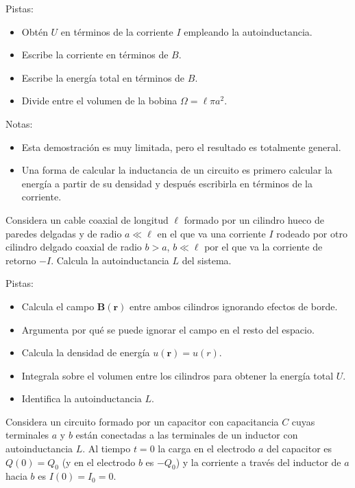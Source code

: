 \documentclass{exam}
\begin{document}
\begin{questions}
  Pistas:
  \begin{itemize}
  \item Obtén $U$ en términos de la corriente $I$ empleando la
    autoinductancia.
  \item Escribe la corriente en términos de $B$.
  \item Escribe la energía total en términos de $B$.
  \item Divide entre el volumen de la bobina $\Omega=\ell\pi a^2$.
  \end{itemize}
  Notas:
  \begin{itemize}
  \item Esta demostración es muy limitada, pero el resultado es
    totalmente general.
  \item Una forma de calcular la inductancia de un circuito es primero
    calcular la energía a partir de su densidad y después escribirla
    en términos de la corriente.
  \end{itemize}

  \question Considera un cable coaxial de longitud $\ell$ formado por un cilindro hueco
  de paredes delgadas y de radio $a\ll \ell$ en el que va una corriente
  $I$ rodeado por otro cilindro delgado coaxial de radio $b>a$, $b\ll \ell$ por el
  que va la corriente de retorno $-I$. Calcula la autoinductancia $L$
  del sistema.

  Pistas:
  \begin{itemize}
  \item Calcula el campo $\bm B(\bm r)$ entre ambos cilindros
    ignorando efectos de borde.
  \item Argumenta por qué se puede ignorar el campo en el resto del espacio.
  \item Calcula la densidad de energía $u(\bm r)=u(r)$.
  \item Integrala sobre el volumen entre los cilindros para obtener la
    energía total $U$.
  \item Identifica la autoinductancia $L$.
  \end{itemize}

  \question Considera un circuito formado por un capacitor con
  capacitancia $C$ cuyas terminales $a$ y $b$ están conectadas a las
  terminales de un inductor con autoinductancia $L$. Al tiempo $t=0$
  la carga en el electrodo $a$ del capacitor es $Q(0)=Q_0$ (y en el
  electrodo $b$ es $-Q_0$) y la corriente a través del inductor de $a$
  hacia $b$ es $I(0)=I_0=0$.
\end{questions}
\end{document}
